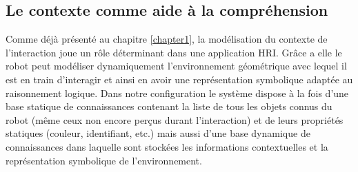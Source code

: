 \documentclass[a4paper,11pt,twoside]{StyleThese}
\begin{document}



\subsection{Le contexte comme aide à la compréhension}

Comme déjà présenté au chapitre \ref{chapter1}, la modélisation du contexte de l’interaction joue un rôle déterminant dans une application HRI. Grâce a elle le robot peut modéliser dynamiquement l’environnement
géométrique avec lequel il est en train d’interagir et ainsi en avoir une représentation symbolique adaptée au raisonnement logique.
Dans notre configuration le système dispose à la fois d’une base statique de connaissances contenant la liste de tous les objets connus du robot (même ceux non encore perçus durant l’interaction) et de leurs propriétés statiques (couleur, identifiant, etc.) mais aussi d’une base dynamique de connaissances dans laquelle sont stockées les informations contextuelles et la représentation symbolique de l'environnement.
\end{document}
